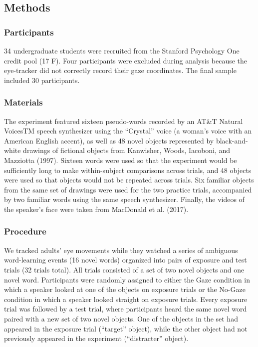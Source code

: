 \documentclass[man,floatsintext]{apa6}
\begin{document}
\subsection{Methods}\label{methods-1}

\subsubsection{Participants}\label{participants-1}

34 undergraduate students were recruited from the Stanford Psychology
One credit pool (17 F). Four participants were excluded during analysis
because the eye-tracker did not correctly record their gaze coordinates.
The final sample included 30 participants.

\subsubsection{Materials}\label{materials-1}

The experiment featured sixteen pseudo-words recorded by an AT\&T
Natural VoicesTM speech synthesizer using the \enquote{Crystal} voice (a
woman's voice with an American English accent), as well as 48 novel
objects represented by black-and-white drawings of fictional objects
from Kanwisher, Woods, Iacoboni, and Mazziotta (1997). Sixteen words
were used so that the experiment would be sufficiently long to make
within-subject comparisons across trials, and 48 objects were used so
that objects would not be repeated across trials. Six familiar objects
from the same set of drawings were used for the two practice trials,
accompanied by two familiar words using the same speech synthesizer.
Finally, the videos of the speaker's face were taken from MacDonald et
al. (2017).

\subsubsection{Procedure}\label{procedure-1}

We tracked adults' eye movements while they watched a series of
ambiguous word-learning events (16 novel words) organized into pairs of
exposure and test trials (32 trials total). All trials consisted of a
set of two novel objects and one novel word. Participants were randomly
assigned to either the Gaze condition in which a speaker looked at one
of the objects on exposure trials or the No-Gaze condition in which a
speaker looked straight on exposure trials. Every exposure trial was
followed by a test trial, where participants heard the same novel word
paired with a new set of two novel objects. One of the objects in the
set had appeared in the exposure trial (\enquote{target} object), while
the other object had not previously appeared in the experiment
(\enquote{distracter} object).
\end{document}
